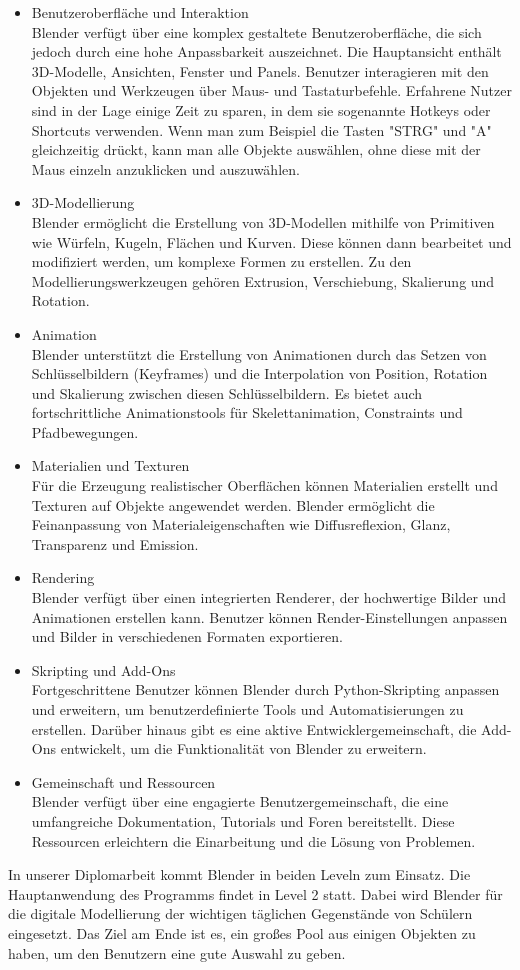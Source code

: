 \begin{itemize}
	\item Benutzeroberfläche und Interaktion\\
	Blender verfügt über eine komplex gestaltete Benutzeroberfläche, die sich jedoch durch eine hohe Anpassbarkeit auszeichnet. Die Hauptansicht enthält 3D-Modelle, Ansichten, Fenster und Panels. Benutzer interagieren mit den Objekten und Werkzeugen über Maus- und Tastaturbefehle. Erfahrene Nutzer sind in der Lage einige Zeit zu sparen, in dem sie sogenannte Hotkeys oder Shortcuts verwenden. Wenn man zum Beispiel die Tasten "STRG" und "A" gleichzeitig drückt, kann man alle Objekte auswählen, ohne diese mit der Maus einzeln anzuklicken und auszuwählen.
	\item 3D-Modellierung\\
	Blender ermöglicht die Erstellung von 3D-Modellen mithilfe von Primitiven wie Würfeln, Kugeln, Flächen und Kurven. Diese können dann bearbeitet und modifiziert werden, um komplexe Formen zu erstellen. Zu den Modellierungswerkzeugen gehören Extrusion, Verschiebung, Skalierung und Rotation.
	\item Animation\\
	Blender unterstützt die Erstellung von Animationen durch das Setzen von Schlüsselbildern (Keyframes) und die Interpolation von Position, Rotation und Skalierung zwischen diesen Schlüsselbildern. Es bietet auch fortschrittliche Animationstools für Skelettanimation, Constraints und Pfadbewegungen.
	\item Materialien und Texturen\\
	Für die Erzeugung realistischer Oberflächen können Materialien erstellt und Texturen auf Objekte angewendet werden. Blender ermöglicht die Feinanpassung von Materialeigenschaften wie Diffusreflexion, Glanz, Transparenz und Emission.
	\item Rendering\\
	Blender verfügt über einen integrierten Renderer, der hochwertige Bilder und Animationen erstellen kann. Benutzer können Render-Einstellungen anpassen und Bilder in verschiedenen Formaten exportieren.
	\item Skripting und Add-Ons\\
	Fortgeschrittene Benutzer können Blender durch Python-Skripting anpassen und erweitern, um benutzerdefinierte Tools und Automatisierungen zu erstellen. Darüber hinaus gibt es eine aktive Entwicklergemeinschaft, die Add-Ons entwickelt, um die Funktionalität von Blender zu erweitern.
	\item Gemeinschaft und Ressourcen\\
	Blender verfügt über eine engagierte Benutzergemeinschaft, die eine umfangreiche Dokumentation, Tutorials und Foren bereitstellt. Diese Ressourcen erleichtern die Einarbeitung und die Lösung von Problemen.
\end{itemize}
In unserer Diplomarbeit kommt Blender in beiden Leveln zum Einsatz. Die Hauptanwendung des Programms findet in Level 2 statt. Dabei wird Blender für die digitale Modellierung der wichtigen täglichen Gegenstände von Schülern eingesetzt. Das Ziel am Ende ist es, ein großes Pool aus einigen Objekten zu haben, um den Benutzern eine gute Auswahl zu geben.

